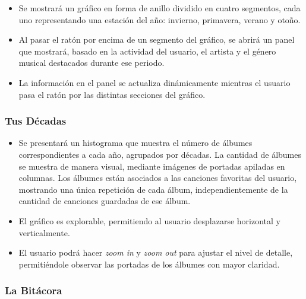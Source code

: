 \begin{itemize}
    \item Se mostrará un gráfico en forma de anillo dividido en cuatro segmentos, cada uno representando una estación del año: invierno, primavera, verano y otoño.
    \item Al pasar el ratón por encima de un segmento del gráfico, se abrirá un panel que mostrará, basado en la actividad del usuario, el artista y el género musical destacados durante ese periodo.
    \item La información en el panel se actualiza dinámicamente mientras el usuario pasa el ratón por las distintas secciones del gráfico.
\end{itemize}

\subsubsection*{Tus Décadas}

\begin{itemize}
    \item Se presentará un histograma que muestra el número de álbumes correspondientes a cada año, agrupados por décadas. La cantidad de álbumes se muestra de manera visual, mediante imágenes de portadas apiladas en columnas. Los álbumes están asociados a las canciones favoritas del usuario, mostrando una única repetición de cada álbum, independientemente de la cantidad de canciones guardadas de ese álbum.
    \item El gráfico es explorable, permitiendo al usuario desplazarse horizontal y verticalmente.
    \item El usuario podrá hacer \textit{zoom in} y \textit{zoom out} para ajustar el nivel de detalle, permitiéndole observar las portadas de los álbumes con mayor claridad.
\end{itemize}

\subsubsection*{La Bitácora}

